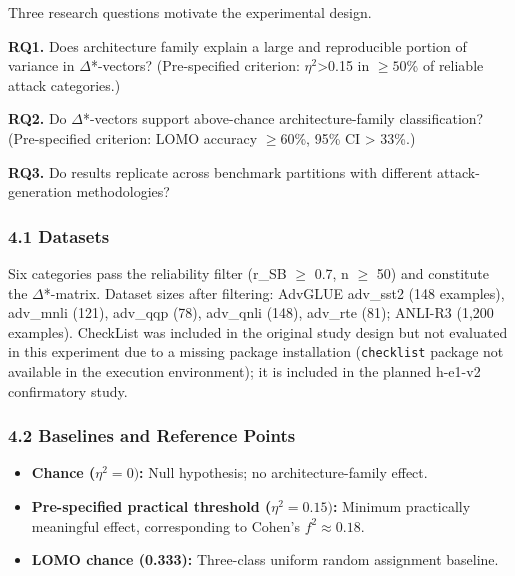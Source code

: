 
Three research questions motivate the experimental design.

\textbf{RQ1.} Does architecture family explain a large and reproducible portion of variance in $\Delta$*-vectors? (Pre-specified criterion: $\eta^2$>0.15 in $\geq 50$\% of reliable attack categories.)

\textbf{RQ2.} Do $\Delta$*-vectors support above-chance architecture-family classification? (Pre-specified criterion: LOMO accuracy $\geq 60$\%, 95\% CI > 33\%.)

\textbf{RQ3.} Do results replicate across benchmark partitions with different attack-generation methodologies?

\subsubsection{4.1 Datasets}

\begin{table}[htbp]
\centering
{}
\end{table}

Six categories pass the reliability filter (r\_SB $\geq$ 0.7, n $\geq$ 50) and constitute the $\Delta$*-matrix. Dataset sizes after filtering: AdvGLUE adv\_sst2 (148 examples), adv\_mnli (121), adv\_qqp (78), adv\_qnli (148), adv\_rte (81); ANLI-R3 (1,200 examples). CheckList \citep{Ribeiro2020Beyond} was included in the original study design but not evaluated in this experiment due to a missing package installation (\texttt{checklist} package not available in the execution environment); it is included in the planned h-e1-v2 confirmatory study.

\subsubsection{4.2 Baselines and Reference Points}

\begin{itemize}
\item \textbf{Chance ($\eta^{2}=0)$:} Null hypothesis; no architecture-family effect.
\item \textbf{Pre-specified practical threshold ($\eta^{2}=0.15)$:} Minimum practically meaningful effect, corresponding to Cohen's $f^{2}\approx 0.18$.
\item \textbf{LOMO chance (0.333):} Three-class uniform random assignment baseline.
\end{itemize}


